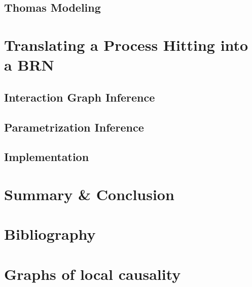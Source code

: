 \documentclass[fleqn,8pt,t]{beamer}
\begin{document}
\subsection{Thomas Modeling}
%

\section{Translating a Process Hitting into a BRN}
%
\subsection{Interaction Graph Inference}
%
\subsection{Parametrization Inference}
%
\subsection{Implementation}


\section{Summary \& Conclusion}

\appendix
\section[x]{Bibliography}

\section[Annex: Graphs of local causality]{Graphs of local causality}
%
%
\end{document}

